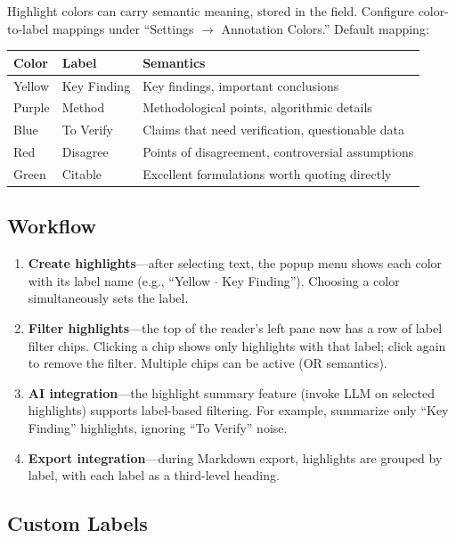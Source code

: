 Highlight colors can carry semantic meaning, stored in the  field.
Configure color-to-label mappings under ``Settings $\to$ Annotation Colors.'' Default
mapping:

\begin{longtable}{p{2cm} p{3.5cm} p{7cm}}
\toprule
\textbf{Color} & \textbf{Label} & \textbf{Semantics} \\
\midrule
\endhead
Yellow & Key Finding & Key findings, important conclusions \\
Purple & Method & Methodological points, algorithmic details \\
Blue & To Verify & Claims that need verification, questionable data \\
Red & Disagree & Points of disagreement, controversial assumptions \\
Green & Citable & Excellent formulations worth quoting directly \\
\bottomrule
\end{longtable}

\subsection{Workflow}

\begin{enumerate}
  \item \textbf{Create highlights}---after selecting text, the popup menu shows each
    color with its label name (e.g., ``Yellow $\cdot$ Key Finding''). Choosing a color
    simultaneously sets the label.
  \item \textbf{Filter highlights}---the top of the reader's left pane now has a row
    of label filter chips. Clicking a chip shows only highlights with that label;
    click again to remove the filter. Multiple chips can be active (OR semantics).
  \item \textbf{AI integration}---the highlight summary feature (invoke LLM on selected
    highlights) supports label-based filtering. For example, summarize only ``Key
    Finding'' highlights, ignoring ``To Verify'' noise.
  \item \textbf{Export integration}---during Markdown export, highlights are grouped
    by label, with each label as a third-level heading.
\end{enumerate}

\subsection{Custom Labels}

